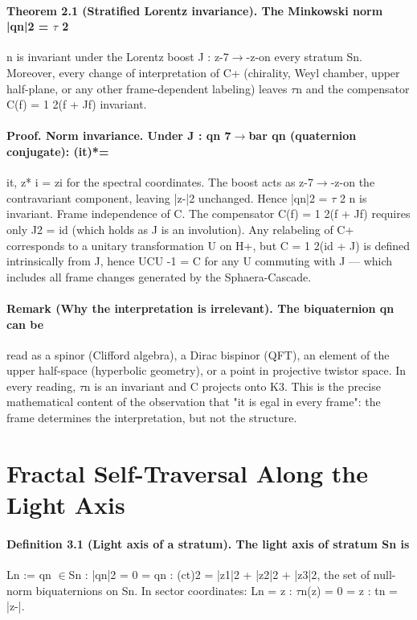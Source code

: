 \documentclass[12pt,a4paper]{article}
\begin{document}
\paragraph*{Theorem 2.1 (Stratified Lorentz invariance). The Minkowski norm |qn|2 = $\tau$ 2}
n is invariant under the Lorentz boost J : z-7$\to$-z-on every stratum Sn. Moreover, every change of interpretation of C+ (chirality, Weyl chamber, upper half-plane, or any other frame-dependent labeling) leaves $\tau$n and the compensator C(f) = 1 2(f + Jf) invariant.
\paragraph*{Proof. Norm invariance. Under J : qn 7$\to$bar qn (quaternion conjugate): (it)*=}
it, z* i = zi for the spectral coordinates. The boost acts as z-7$\to$-z-on the contravariant component, leaving |z-|2 unchanged. Hence |qn|2 = $\tau$ 2 n is invariant. Frame independence of C. The compensator C(f) = 1 2(f + Jf) requires only J2 = id (which holds as J is an involution). Any relabeling of C+ corresponds to a unitary transformation U on H+, but C = 1 2(id + J) is defined intrinsically from J, hence UCU -1 = C for any U commuting with J --- which includes all frame changes generated by the Sphaera-Cascade.
\paragraph*{Remark (Why the interpretation is irrelevant). The biquaternion qn can be}
read as a spinor (Clifford algebra), a Dirac bispinor (QFT), an element of the upper half-space (hyperbolic geometry), or a point in projective twistor space. In every reading, $\tau$n is an invariant and C projects onto K3. This is the precise mathematical content of the observation that "it is egal in every frame": the frame determines the interpretation, but not the structure.

\section{Fractal Self-Traversal Along the Light Axis}
\paragraph*{Definition 3.1 (Light axis of a stratum). The light axis of stratum Sn is}
Ln := {qn $\in$Sn : |qn|2 = 0} = {qn : (ct)2 = |z1|2 + |z2|2 + |z3|2}, the set of null-norm biquaternions on Sn. In sector coordinates: Ln = {z : $\tau$n(z) = 0} = {z : tn = |z-|}.
\end{document}
